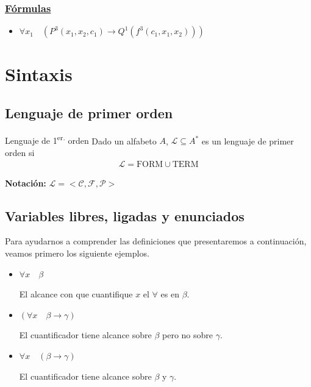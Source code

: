 \subsubsection{\underline{Fórmulas}}

\begin{itemize}
        \item $\forall x_1 \quad (P^{3}(x_1, x_2, c_1) 
            \to Q^{1}(f^{3}(c_1,x_1,x_2)))$
\end{itemize}


\section{Sintaxis} %

\subsection{Lenguaje de primer orden}

\begin{definicion}{Lenguaje de 1\textsuperscript{er.} orden}{}
    Dado un alfabeto $A$, $\mathcal{L} \subseteq A^{*}$ es un lenguaje
    de primer orden si
    \begin{gather*}
        \mathcal{L} = \mathrm{FORM} \cup \mathrm{TERM}
    \end{gather*}

    \bigskip
    \textbf{Notación:}
    $\mathcal{L} = <\mathcal{C}, \mathcal{F}, \mathcal{P}>$
\end{definicion}


\subsection{Variables libres, ligadas y enunciados}

Para ayudarnos a comprender las definiciones que presentaremos a continuación,
veamos primero los siguiente ejemplos.

\begin{itemize}
    \item $\forall x \quad \beta$ %

        El alcance con que cuantifique $x$ el $\forall$ es en $\beta$.

    \item $(\forall x \quad \beta \to \gamma)$

        El cuantificador tiene alcance sobre $\beta$ pero no sobre $\gamma$.

    \item $\forall x \quad (\beta \to \gamma)$

        El cuantificador tiene alcance sobre $\beta$ y $\gamma$.
\end{itemize}

